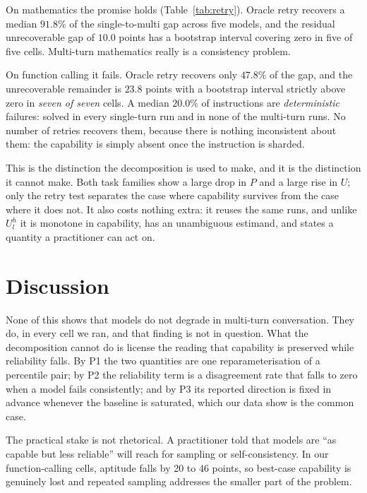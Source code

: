 \documentclass{article}
\begin{document}
On mathematics the promise holds (Table~\ref{tab:retry}). Oracle retry recovers a median $91.8\%$ of the single-to-multi
gap across five models, and the residual unrecoverable gap of $10.0$ points has a bootstrap
interval covering zero in five of five cells. Multi-turn mathematics really is a consistency
problem.

On function calling it fails. Oracle retry recovers only $47.8\%$ of the gap, and the unrecoverable
remainder is $23.8$ points with a bootstrap interval strictly above zero in \emph{seven of seven}
cells. A median $20.0\%$ of instructions are \emph{deterministic} failures: solved in every
single-turn run and in none of the multi-turn runs. No number of retries recovers them, because
there is nothing inconsistent about them: the capability is simply absent once the instruction is
sharded.

This is the distinction the decomposition is used to make, and it is the distinction it cannot make.
Both task families show a large drop in $P$ and a large rise in $U$; only the retry test separates
the case where capability survives from the case where it does not. It also costs nothing extra: it
reuses the same runs, and unlike $U^h_l$ it is monotone in capability, has an unambiguous estimand,
and states a quantity a practitioner can act on.

\section{Discussion}

None of this shows that models do not degrade in multi-turn conversation. They do, in every cell we
ran, and that finding is not in question. What the decomposition cannot do is license the reading
that capability is preserved while reliability falls. By P1 the two quantities are one
reparameterisation of a percentile pair; by P2 the reliability term is a disagreement rate that
falls to zero when a model fails consistently; and by P3 its reported direction is fixed in advance
whenever the baseline is saturated, which our data show is the common case.

The practical stake is not rhetorical. A practitioner told that models are ``as capable but less
reliable'' will reach for sampling or self-consistency. In our function-calling cells, aptitude
falls by 20 to 46 points, so best-case capability is genuinely lost and repeated sampling addresses
the smaller part of the problem.
\end{document}
